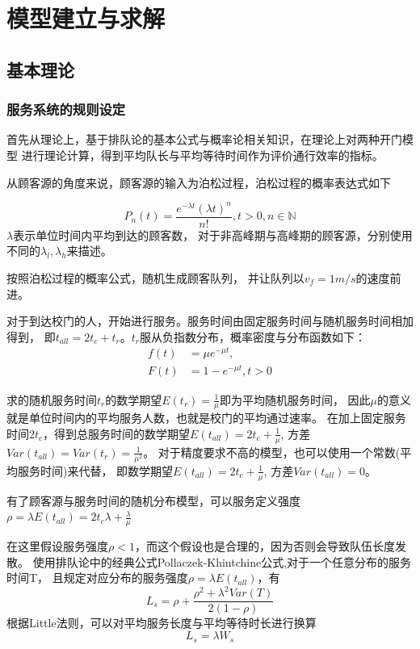 \section{模型建立与求解}
\subsection{基本理论}
\subsubsection{服务系统的规则设定}
    首先从理论上，基于排队论的基本公式与概率论相关知识，在理论上对两种开门模型
    进行理论计算，得到平均队长与平均等待时间作为评价通行效率的指标。

    从顾客源的角度来说，顾客源的输入为泊松过程，泊松过程的概率表达式如下

    \begin{equation}
        P_n(t)=\frac{e^{-\lambda t}(\lambda t)^n}{n!},t>0,n \in \mathbb{N}
    \end{equation}
    $\lambda$表示单位时间内平均到达的顾客数，
    对于非高峰期与高峰期的顾客源，分别使用不同的$\lambda_l,\lambda_h$来描述。

    按照泊松过程的概率公式，随机生成顾客队列，
    并让队列以$v_f=1 m/s$的速度前进。

    对于到达校门的人，开始进行服务。服务时间由固定服务时间与随机服务时间相加得到，
    即$t_{all}=2t_{c}+t_{r}$。$t_r$服从负指数分布，概率密度与分布函数如下：
    \begin{equation}
        \begin{aligned}
            f(t) &=\mu e^{-\mu t},  \\
            F(t) &=1-e^{-\mu t},t>0
        \end{aligned}
    \end{equation}

    求的随机服务时间$t_r$的数学期望$E(t_r)=\frac{1}{\mu}$即为平均随机服务时间，
    因此$\mu$的意义就是单位时间内的平均服务人数，也就是校门的平均通过速率。
    在加上固定服务时间$2t_c$，得到总服务时间的数学期望$E(t_{all})=2t_c+\frac{1}{\mu}$,
    方差$ Var(t_{all})=Var(t_r)=\frac{1}{\mu^2}$。
    对于精度要求不高的模型，也可以使用一个常数(平均服务时间)来代替，
    即数学期望$E(t_{all})=2t_c+\frac{1}{\mu}$,
    方差$ Var(t_{all})=0$。

    有了顾客源与服务时间的随机分布模型，可以服务定义强度
    $\rho=\lambda E(t_{all})=2t_c \lambda+\frac{\lambda}{\mu}$

    在这里假设服务强度$\rho<1$，而这个假设也是合理的，因为否则会导致队伍长度发散。
    使用排队论中的经典公式Pollaczek-Khintchine公式,对于一个任意分布的服务时间T，
    且规定对应分布的服务强度$\rho=\lambda E(t_{all})$，有
    \begin{equation}
        L_s=\rho +\frac{\rho^2 +\lambda^2 Var(T)}{2(1-\rho)}
    \end{equation}
    根据Little法则，可以对平均服务长度与平均等待时长进行换算
    \begin{equation}
        L_s=\lambda W_s
    \end{equation}

